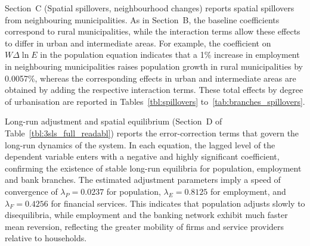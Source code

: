\documentclass[a4paper,11pt,oneside]{article}
\begin{document}
{%



Section~C (Spatial spillovers, neighbourhood changes) reports spatial spillovers from neighbouring municipalities. As in Section~B, the baseline coefficients correspond to rural municipalities, while the interaction terms allow these effects to differ in urban and intermediate areas. For example, the coefficient on $W\Delta\ln E$ in the population equation indicates that a 1\% increase in employment in neighbouring municipalities raises population growth in rural municipalities by 0.0057\%, whereas the corresponding effects in urban and intermediate areas are obtained by adding the respective interaction terms. These total effects by degree of urbanisation are reported in Tables~\ref{tbl:spillovers} to~\ref{tab:branches_spillovers}.


Long-run adjustment and spatial equilibrium (Section~D of Table~\ref{tbl:3sls_full_readabl})
reports the error-correction terms that govern the long-run dynamics of the system. In each equation, the lagged level of the dependent variable enters with a negative and highly significant coefficient, confirming the existence of stable long-run equilibria for population, employment and bank branches. The estimated adjustment parameters imply a speed of convergence of $\lambda_P=0.0237$ for population, $\lambda_E=0.8125$ for employment, and $\lambda_F=0.4256$ for financial services. This indicates that population adjusts slowly to disequilibria, while employment and the banking network exhibit much faster mean reversion, reflecting the greater mobility of firms and service providers relative to households.

}
\end{document}
